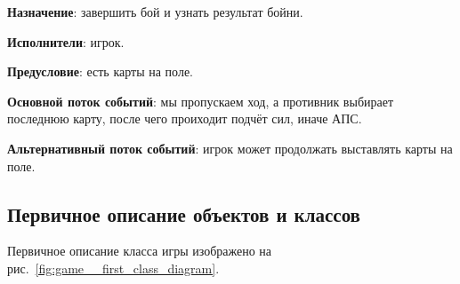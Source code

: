 \documentclass[12pt, a4paper, simple]{eskdtext}
\begin{document}
    \textbf{Назначение}: завершить бой и узнать результат бойни.

    \textbf{Исполнители}: игрок.

    \textbf{Предусловие}: есть карты на поле.

    \textbf{Основной поток событий}: мы пропускаем ход, а противник выбирает последнюю карту, после чего проиходит подчёт сил, иначе АПС.

    \textbf{Альтернативный поток событий}: игрок может продолжать выставлять карты на поле.

    \newpage
    \subsection{Первичное описание объектов и классов}

    Первичное описание класса игры изображено на рис.~\ref{fig:game__first_class_diagram}.
\end{document}
